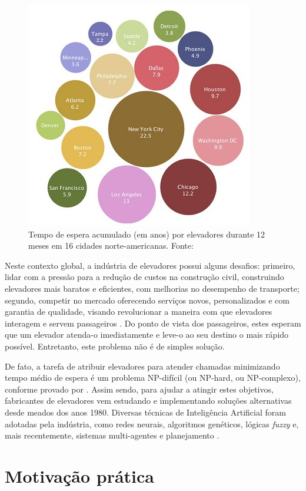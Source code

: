 \begin{figure}[htb!]
\centering\includegraphics{img/time-cost.jpg}
\caption{\label{fig:fig1}Tempo de espera acumulado (em anos) por elevadores durante 12 meses em 16 cidades norte-americanas. Fonte: \cite{IBM10}}
\end{figure}

Neste contexto global, a indústria de elevadores possui alguns desafios: primeiro, lidar com a pressão para a redução de custos na construção civil, construindo elevadores mais baratos e eficientes, com melhorias no desempenho de transporte; segundo, competir no mercado oferecendo serviços novos, personalizados e com garantia de qualidade, visando revolucionar a maneira com que elevadores interagem e servem passageiros \cite{KOEHLEROTTIGER02}. Do ponto de vista dos passageiros, estes esperam que um elevador atenda-o imediatamente e leve-o ao seu destino o mais rápido possível. Entretanto, este problema não é de simples solução.

De fato, a tarefa de atribuir elevadores para atender chamadas minimizando tempo médio de espera é um problema NP-difícil (ou NP-hard, ou NP-complexo), conforme provado por \cite{SeKo99}. Assim sendo, para ajudar a atingir estes objetivos, fabricantes de elevadores vem estudando e implementando soluções alternativas desde meados dos anos 1980. Diversas técnicas de Inteligência Artificial foram adotadas pela indústria, como redes neurais, algoritmos genéticos, lógicas \textit{fuzzy} e, mais recentemente, sistemas multi-agentes e planejamento \cite{KOEHLEROTTIGER02}.

\section{Motivação prática}

